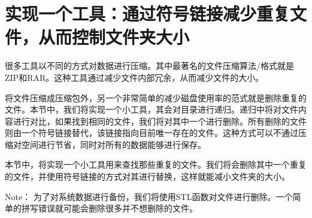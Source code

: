 \section{实现一个工具：通过符号链接减少重复文件，从而控制文件夹大小}

很多工具以不同的方式对数据进行压缩。其中最著名的文件压缩算法/格式就是ZIP和RAR。这种工具通过减少文件内部冗余，从而减少文件的大小。

将文件压缩成压缩包外，另一个非常简单的减少磁盘使用率的范式就是删除重复的文件。本节中，我们将实现一个小工具，其会对目录进行递归。递归中将对文件内容进行对比，如果找到相同的文件，我们将对其中一个进行删除。所有删除的文件则由一个符号链接替代，该链接指向目前唯一存在的文件。这种方式可以不通过压缩对空间进行节省，同时对所有的数据能够进行保存。


本节中，将实现一个小工具用来查找那些重复的文件。我们将会删除其中一个重复的文件，并使用符号链接的方式对其进行替换，这样就能减小文件夹的大小。

\begin{myInfoBox}
Note： 为了对系统数据进行备份，我们将使用STL函数对文件进行删除。一个简单的拼写错误就可能会删除很多并不想删除的文件。
\end{myInfoBox}

